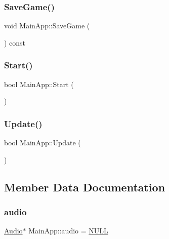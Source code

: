 \mbox{\label{class_main_app_a837f779a744ef4534c48c9a392759b3a}} 
\subsubsection{\texorpdfstring{SaveGame()}{SaveGame()}}
{\footnotesize\ttfamily void Main\+App\+::\+Save\+Game (\begin{DoxyParamCaption}{ }\end{DoxyParamCaption}) const}

\mbox{\label{class_main_app_ae17fe90944a2c89a3573170850b089ad}} 
\subsubsection{\texorpdfstring{Start()}{Start()}}
{\footnotesize\ttfamily bool Main\+App\+::\+Start (\begin{DoxyParamCaption}{ }\end{DoxyParamCaption})}

\mbox{\label{class_main_app_a0568590ab3d5426d3b3817c333720dd2}} 
\subsubsection{\texorpdfstring{Update()}{Update()}}
{\footnotesize\ttfamily bool Main\+App\+::\+Update (\begin{DoxyParamCaption}{ }\end{DoxyParamCaption})}



\subsection{Member Data Documentation}
\mbox{\label{class_main_app_aa275adc9bd13346379334753e0ab5e50}} 
\subsubsection{\texorpdfstring{audio}{audio}}
{\footnotesize\ttfamily \mbox{\hyperlink{class_audio}{Audio}}$\ast$ Main\+App\+::audio = \mbox{\hyperlink{_defs_8h_a070d2ce7b6bb7e5c05602aa8c308d0c4}{N\+U\+LL}}}

